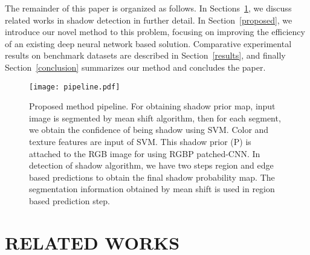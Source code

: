 \documentclass[letterpaper, 10 pt, conference]{ieeeconf}
\begin{document}
The remainder of this paper is organized as follows. In Sections~\ref{related}, we discuss related works in shadow detection in further detail. In Section~\ref{proposed}, we introduce our novel method to this problem, focusing on improving the efficiency of an existing deep neural network based solution. Comparative experimental results on benchmark datasets are described in Section~\ref{results}, and finally Section~\ref{conclusion} summarizes our method and concludes the
paper.

\begin{figure*}[t]
\texttt{[image: pipeline.pdf]}
\centering
\caption{Proposed method pipeline. For obtaining shadow prior map, input image is segmented by mean shift algorithm, then for each segment, we obtain the confidence of being shadow using SVM. Color and texture features are input of SVM. This shadow prior (P) is attached to the RGB image for using RGBP patched-CNN. In detection of shadow algorithm, we have two steps region and edge based predictions to obtain the final shadow probability map. The segmentation information obtained by mean shift is used in region based prediction step.}
\label{sample_fig}
\end{figure*}

\section{RELATED WORKS}
\label{related}
\end{document}
